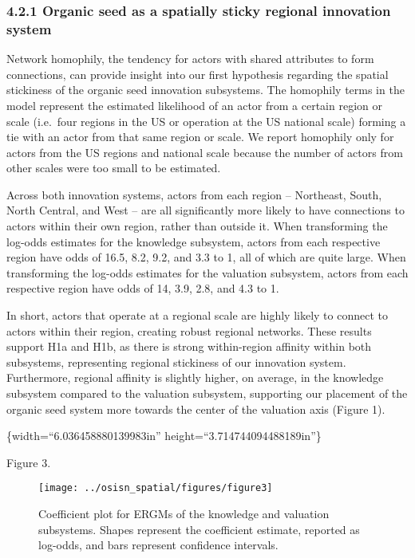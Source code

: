\documentclass[twoside,12pt,final]{ucthesis-CA2012}
\begin{document}
\begin{ucmainmatter}
{\subsubsection{4.2.1 Organic seed as a spatially sticky regional innovation system}\label{organic-seed-as-a-spatially-sticky-regional-innovation-system}}

Network \textquotesingle homophily\textquotesingle, the tendency for actors with shared attributes to
form connections, can provide insight into our first hypothesis
regarding the spatial stickiness of the organic seed innovation
subsystems. The homophily terms in the model represent the estimated
likelihood of an actor from a certain region or scale (i.e.~four regions
in the US or operation at the US national scale) forming a tie with an
actor from that same region or scale. We report homophily only for
actors from the US regions and national scale because the number of
actors from other scales were too small to be estimated.

Across both innovation systems, actors from each region -- Northeast,
South, North Central, and West -- are all significantly more likely to
have connections to actors within their own region, rather than outside
it. When transforming the log-odds estimates for the knowledge
subsystem, actors from each respective region have odds of 16.5, 8.2,
9.2, and 3.3 to 1, all of which are quite large. When transforming the
log-odds estimates for the valuation subsystem, actors from each
respective region have odds of 14, 3.9, 2.8, and 4.3 to 1.

In short, actors that operate at a regional scale are highly likely to
connect to actors within their region, creating robust regional
networks. These results support H1a and H1b, as there is strong
within-region affinity within both subsystems, representing regional
stickiness of our innovation system. Furthermore, regional affinity is
slightly higher, on average, in the knowledge subsystem compared to the
valuation subsystem, supporting our placement of the organic seed system
more towards the center of the valuation axis (Figure 1).

\{width=``6.036458880139983in''
height=``3.714744094488189in''\}

Figure 3.
\begin{figure}

{\centering \texttt{[image: ../osisn\_spatial/figures/figure3]} 

}

\caption{Coefficient plot for ERGMs of the knowledge and valuation subsystems. Shapes represent the coefficient estimate, reported as log-odds, and bars represent confidence intervals.}\label{fig:unnamed-chunk-13}
\end{figure}
\hypertarget{vertical-coupling-via-national-scale-bridges}{%
}
\end{ucmainmatter}
\end{document}
